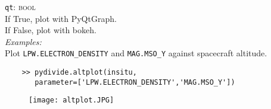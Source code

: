 \documentclass{article}
\begin{document}
\indent \texttt{qt}: \textsc{bool}\\
\indent \indent If True, plot with PyQtGraph.\\
\indent \indent If False, plot with bokeh.\\
\noindent \textit{Examples:}\\
\vspace{-5mm}
\indent Plot \texttt{LPW.ELECTRON\_DENSITY} and \texttt{MAG.MSO\_Y} against spacecraft altitude.
\begin{verbatim}
    >> pydivide.altplot(insitu, 
       parameter=['LPW.ELECTRON_DENSITY','MAG.MSO_Y'])
\end{verbatim}
\begin{figure}[H]
\centering
\texttt{[image: altplot.JPG]}
\end{figure}
\end{document}
